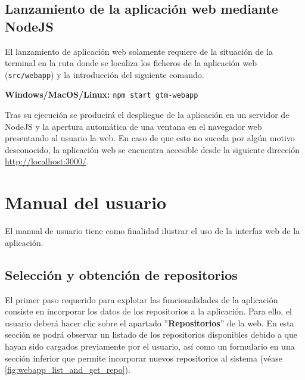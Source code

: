 \subsection{Lanzamiento de la aplicación web mediante NodeJS}

El lanzamiento de aplicación web solamente requiere de la situación de la terminal en la ruta donde se localiza los ficheros de la aplicación web (\texttt{src/webapp}) y la introducción del siguiente comando. 

\vspace{0.5cm}
\centerline{\textbf{Windows/MacOS/Linux: } \texttt{npm start gtm-webapp}}
\vspace{0.4cm}

Tras su ejecución se producirá el despliegue de la aplicación en un servidor de NodeJS y la apertura automática de una ventana en el navegador web presentando al usuario la web. En caso de que esto no suceda por algún motivo desconocido, la aplicación web se encuentra accesible desde la siguiente dirección \url{http://localhost:3000/}.

\section{Manual del usuario}

El manual de usuario tiene como finalidad ilustrar el uso de la interfaz web de la aplicación.

\subsection{Selección y obtención de repositorios}

El primer paso requerido para explotar las funcionalidades de la aplicación consiste en incorporar los datos de los repositorios a la aplicación. Para ello, el usuario deberá hacer clic sobre el apartado ''\textbf{Repositorios}'' de la web. En esta sección se podrá observar un listado de los repositorios disponibles debido a que hayan sido cargados previamente por el usuario, así como un formulario en una sección inferior que permite incorporar nuevos repositorios al sistema (véase \autoref{fig:webapp_list_and_get_repo}).


